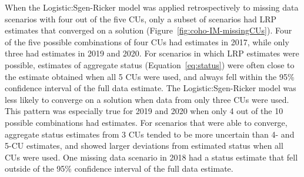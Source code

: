 \documentclass[11pt]{book}
\begin{document}
When the Logistic:Sgen-Ricker model was applied retrospectively to missing data scenarios with four out of the five CUs, only a subset of scenarios had LRP estimates that converged on a solution (Figure~\ref{fig:coho-IM-missingCUs}). Four of the five possible combinations of four CUs had estimates in 2017, while only three had estimates in 2019 and 2020. For scenarios in which LRP estimates were possible, estimates of aggregate status (Equation~\ref{eq:status}) were often close to the estimate obtained when all 5 CUs were used, and always fell within the 95\% confidence interval of the full data estimate. The Logistic:Sgen-Ricker model was less likely to converge on a solution when data from only three CUs were used. This pattern was especially true for 2019 and 2020 when only 4 out of the 10 possible combinations had estimates. For scenarios that were able to converge, aggregate status estimates from 3 CUs tended to be more uncertain than 4- and 5-CU estimates, and showed larger deviations from estimated status when all CUs were used. One missing data scenario in 2018 had a status estimate that fell outside of the 95\% confidence interval of the full data estimate.
\end{document}
